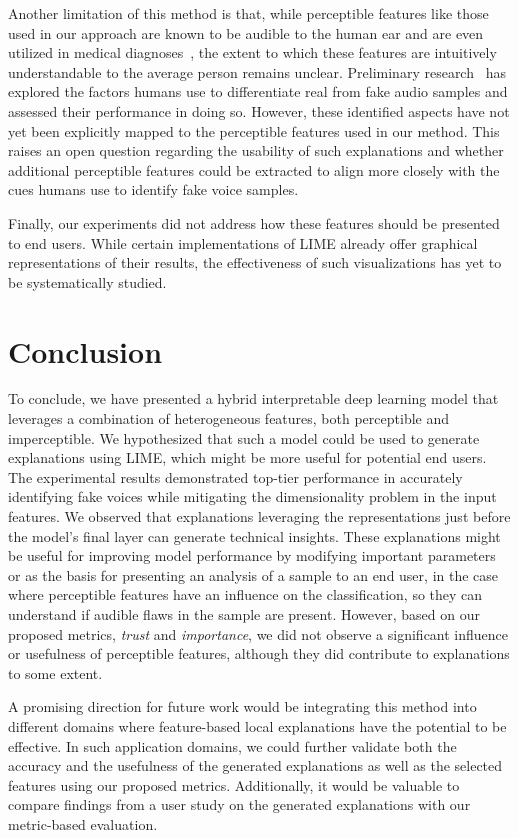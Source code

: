 \documentclass{article}
\begin{document}
Another limitation of this method is that, while perceptible features like those used in our approach are known to be audible to the human ear and are even utilized in medical diagnoses~\cite{chaiwongyen_deepfake-speech_2023}, the extent to which these features are intuitively understandable to the average person remains unclear. Preliminary research~\cite{warren_better_2024,sharevski_blind_2024} has explored the factors humans use to differentiate real from fake audio samples and assessed their performance in doing so. However, these identified aspects have not yet been explicitly mapped to the perceptible features used in our method. This raises an open question regarding the usability of such explanations and whether additional perceptible features could be extracted to align more closely with the cues humans use to identify fake voice samples.

Finally, our experiments did not address how these features should be presented to end users. While certain implementations of LIME already offer graphical representations of their results, the effectiveness of such visualizations has yet to be systematically studied.

\section{Conclusion}
To conclude, we have presented a hybrid interpretable deep learning model that leverages a combination of heterogeneous features, both perceptible and imperceptible. We hypothesized that such a model could be used to generate explanations using LIME, which might be more useful for potential end users. The experimental results demonstrated top-tier performance in accurately identifying fake voices while mitigating the dimensionality problem in the input features. We observed that explanations leveraging the representations just before the model’s final layer can generate technical insights. These explanations might be useful for improving model performance by modifying important parameters or as the basis for presenting an analysis of a sample to an end user, in the case where perceptible features have an influence on the classification, so they can understand if audible flaws in the sample are present. However, based on our proposed metrics, \textit{trust} and \textit{importance}, we did not observe a significant influence or usefulness of perceptible features, although they did contribute to explanations to some extent.

A promising direction for future work would be integrating this method into different domains where feature-based local explanations have the potential to be effective. In such application domains, we could further validate both the accuracy and the usefulness of the generated explanations as well as the selected features using our proposed metrics. Additionally, it would be valuable to compare findings from a user study on the generated explanations with our metric-based evaluation.
	\newpage
	\sloppy
	\printbibliography
	\newpage
\end{document}
